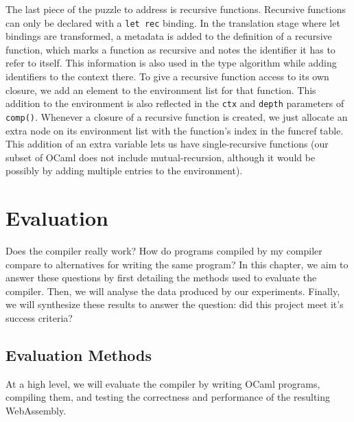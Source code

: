 \documentclass[12pt,a4paper,twoside,openright]{report}
\begin{document}
The last piece of the puzzle to address is recursive functions.
Recursive functions can only be declared with a {\tt let rec} binding.
In the translation stage where let bindings are transformed, a metadata is added to the definition of a recursive function, which marks a function as recursive and notes the identifier it has to refer to itself.
This information is also used in the type algorithm while adding identifiers to the context there.
To give a recursive function access to its own closure, we add an element to the environment list for that function.
This addition to the environment is also reflected in the {\tt ctx} and {\tt depth} parameters of {\tt comp()}.
Whenever a closure of a recursive function is created, we just allocate an extra node on its environment list with the function's index in the funcref table.
This addition of an extra variable lets us have single-recursive functions (our subset of OCaml does not include mutual-recursion, although it would be possibly by adding multiple entries to the environment).

\chapter{Evaluation}

Does the compiler really work?
How do programs compiled by my compiler compare to alternatives for writing the same program?
In this chapter, we aim to answer these questions by first detailing the methods used to evaluate the compiler.
Then, we will analyse the data produced by our experiments.
Finally, we will synthesize these results to answer the question: did this project meet it's success criteria?

\section{Evaluation Methods}
At a high level, we will evaluate the compiler by writing OCaml programs, compiling them, and testing the  correctness and performance of the resulting WebAssembly.
\end{document}
